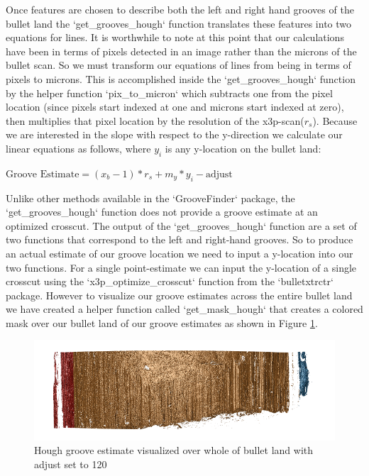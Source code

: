 \documentclass[12pt]{article}\usepackage[]{graphicx}\usepackage[]{color}
\makeatletter
\def\maxwidth{ %
  \ifdim\Gin@nat@width>\linewidth
    \linewidth
  \else
    \Gin@nat@width
  \fi
}
\newenvironment{knitrout}{}{} %
\theoremstyle{nonumberplain}
\makeatother
\begin{document}
Once features are chosen to describe both the left and right hand grooves of the bullet land the `get\_grooves\_hough` function translates these features into two equations for lines. It is worthwhile to note at this point that our calculations have been in terms of pixels detected in an image rather than the microns of the bullet scan. So we must transform our equations of lines from being in terms of pixels to microns. This is accomplished inside the `get\_grooves\_hough` function by the helper function `pix\_to\_micron` which subtracts one from the pixel location (since pixels start indexed at one and microns start indexed at zero), then multiplies that pixel location by the resolution of the x3p-scan($r_s$). Because we are interested in the slope with respect to the y-direction we calculate our linear equations as follows, where $y_i$ is any y-location on the bullet land:

\begin{center}
  $\text{Groove Estimate} = (x_b -1)*r_s + m_y*y_{i} - \text{adjust}$
\end{center}

 Unlike other methods available in the `GrooveFinder` package, the `get\_grooves\_hough` function does not provide a groove estimate at an optimized crosscut. The output of the  `get\_grooves\_hough` function are a set of two functions that correspond to the left and right-hand grooves. So to produce an actual estimate of our groove location we need to input a y-location into our two functions. For a single point-estimate we can input the y-location of a single crosscut using the `x3p\_optimize\_crosscut` function from the `bulletxtrctr` package. However to visualize our groove estimates across the entire bullet land we have created a helper function called `get\_mask\_hough` that creates a colored mask over our bullet land of our groove estimates as shown in Figure \ref{fig:get-mask-hough-example}. 
 


\begin{knitrout}
\color{fgcolor}\begin{figure}[H]

{\centering \includegraphics[width=\maxwidth]{../images/mask-example} 

}

\caption[Hough groove estimate visualized over whole of bullet land with adjust set to 120]{Hough groove estimate visualized over whole of bullet land with adjust set to 120}\label{fig:get-mask-hough-example}
\end{figure}


\end{knitrout}
 
\end{document}
